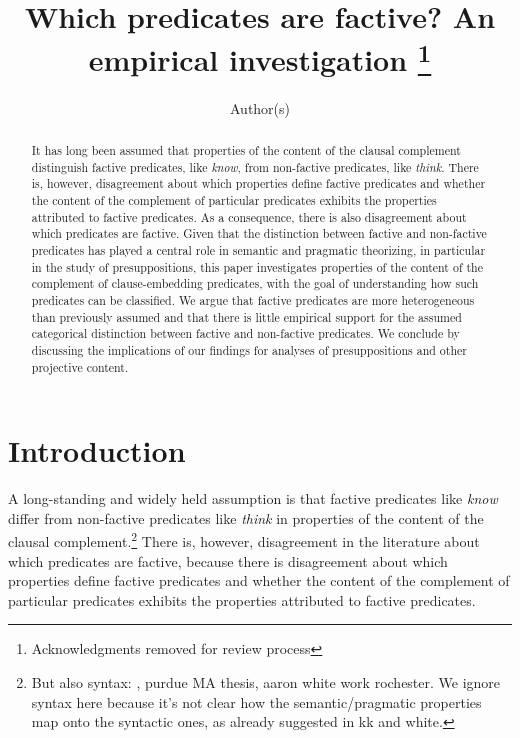 \documentclass[11pt,fleqn]{article}
\title{Which predicates are factive? An empirical investigation%
\thanks{Acknowledgments removed for review process}}
\author{Author(s)}
\newcommand{\6}{\mbox{$[\hspace*{-.6mm}[$}}
\newcommand{\9}{\mbox{$]\hspace*{-.6mm}]$}}
\begin{document}

\maketitle


\begin{abstract}

It has long been assumed that properties of the content of the clausal complement distinguish factive predicates, like {\em know}, from non-factive predicates, like {\em think}. There is, however, disagreement about which properties define factive predicates and whether the content of the complement of particular predicates exhibits the properties attributed to factive predicates. As a consequence, there is also disagreement about which predicates are factive. Given that the distinction between factive and non-factive predicates has played a central role in semantic and pragmatic theorizing, in particular in the study of presuppositions, this paper investigates properties of the content of the complement of clause-embedding predicates, with the goal of understanding how such predicates can be classified. We argue that factive predicates are more heterogeneous than previously assumed and that there is little empirical support for the assumed categorical distinction between factive and non-factive predicates. We conclude by discussing the implications of our findings for analyses of presuppositions and other projective content.


\end{abstract}

			
\section{Introduction}\label{s1}

A long-standing and widely held assumption is that factive predicates like {\em know} differ from non-factive predicates like {\em think} in properties of the content of the clausal complement.\footnote{But also syntax: \citealt{kiparsky-kiparsky70}, purdue MA thesis, aaron white work rochester. We ignore syntax here because it's not clear how the semantic/pragmatic properties map onto the syntactic ones, as already suggested in kk and white.} There is, however, disagreement in the literature about which predicates are factive, because there is disagreement about which properties define factive predicates and whether the content of the complement of particular predicates exhibits the properties attributed to factive predicates. 
\end{document}
